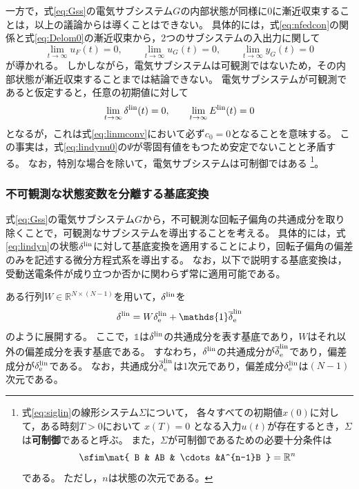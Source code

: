 \documentclass[tombow,dvipdfmx]{corona-a5-1.1}
\begin{document}
一方で，式\ref{eq:Gss}の電気サブシステム$G$の内部状態が同様に0に漸近収束することは，以上の議論からは導くことはできない。
具体的には，式\ref{eq:nfedcon}の関係と式\ref{eq:Delom0}の漸近収束から，2つのサブシステムの入出力に関して
\[
\lim_{t\rightarrow \infty} u_F(t)  =0,\qquad
\lim_{t\rightarrow \infty} u_G(t)  =0,\qquad
\lim_{t\rightarrow \infty} y_G(t)  =0
\]
が導かれる。
しかしながら，電気サブシステムは可観測ではないため，その内部状態が漸近収束することまでは結論できない。
電気サブシステムが可観測であると仮定すると，任意の初期値に対して
\[
\lim_{t\rightarrow \infty}  \delta^{\rm lin}(t)  =0,\qquad
\lim_{t\rightarrow \infty}  E^{\rm lin}(t)  =0
\]
となるが，これは式\ref{eq:linmconv}において必ず$c_0=0$となることを意味する。
この事実は，式\ref{eq:lindynu0}の$\Psi$が零固有値をもつため安定でないことと矛盾する。
なお，特別な場合を除いて，電気サブシステムは可制御ではある
\footnote{
式\ref{eq:siglin}の線形システム$\Sigma$について，
各々すべての初期値$x(0)$に対して，ある時刻$T > 0$において $x(T) = 0$ となる入力$u(t)$が存在するとき，$\Sigma$は\textbf{可制御}であると呼ぶ。
また，$\Sigma$が可制御であるための必要十分条件は
\[
\sfim \mat{
B & AB & \cdots &A^{n-1}B
}
= \mathbb{R}^n
\]
である。
ただし，$n$は状態の次元である。
}。


\subsubsection{不可観測な状態変数を分離する基底変換}

式\ref{eq:Gss}の電気サブシステム$G$から，不可観測な回転子偏角の共通成分を取り除くことで，可観測なサブシステムを導出することを考える。
具体的には，式\ref{eq:lindyn}の状態$\delta^{\rm lin}$に対して基底変換を適用することにより，回転子偏角の偏差のみを記述する微分方程式系を導出する。
なお，以下で説明する基底変換は，受動送電条件が成り立つか否かに関わらず常に適用可能である。

ある行列$W \in \mathbb{R}^{N\times (N-1)}$を用いて，$\delta^{\rm lin}$を
\begin{align}\label{eq:batrinv}
\delta^{\rm lin}
=
W
\delta^{\rm lin}_{\rm e} +
\mathds{1}
\overline{\delta}^{\rm lin}_{\rm e}
\end{align}
のように展開する。
ここで，$\mathds{1}$は$\delta^{\rm lin}$の共通成分を表す基底であり，$W$はそれ以外の偏差成分を表す基底である。
すなわち，$\delta^{\rm lin}$の共通成分が$\overline{\delta}^{\rm lin}_{\rm e}$であり，偏差成分が$\delta^{\rm lin}_{\rm e}$である。
なお，共通成分$\overline{\delta}^{\rm lin}_{\rm e}$は1次元であり，偏差成分$\delta^{\rm lin}_{\rm e}$は$(N-1)$次元である。
\end{document}
